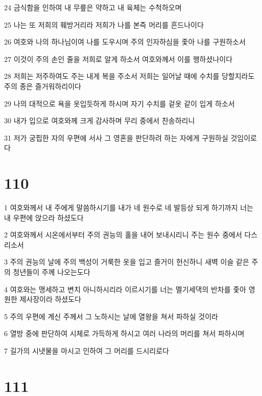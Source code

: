 \par 24 금식함을 인하여 내 무릎은 약하고 내 육체는 수척하오며
\par 25 나는 또 저희의 훼방거리라 저희가 나를 본즉 머리를 흔드나이다
\par 26 여호와 나의 하나님이여 나를 도우시며 주의 인자하심을 좇아 나를 구원하소서
\par 27 이것이 주의 손인 줄을 저희로 알게 하소서 여호와께서 이를 행하셨나이다
\par 28 저희는 저주하여도 주는 내게 복을 주소서 저희는 일어날 때에 수치를 당할지라도 주의 종은 즐거워하리이다
\par 29 나의 대적으로 욕을 옷입듯하게 하시며 자기 수치를 겉옷 같이 입게 하소서
\par 30 내가 입으로 여호와께 크게 감사하며 무리 중에서 찬송하리니
\par 31 저가 궁핍한 자의 우편에 서사 그 영혼을 판단하려 하는 자에게 구원하실 것임이로다

\chapter{110}

\par 1 여호와께서 내 주에게 말씀하시기를 내가 네 원수로 네 발등상 되게 하기까지 너는 내 우편에 앉으라 하셨도다
\par 2 여호와께서 시온에서부터 주의 권능의 홀을 내어 보내시리니 주는 원수 중에서 다스리소서
\par 3 주의 권능의 날에 주의 백성이 거룩한 옷을 입고 즐거이 헌신하니 새벽 이슬 같은 주의 청년들이 주께 나오는도다
\par 4 여호와는 맹세하고 변치 아니하시리라 이르시기를 너는 멜기세댁의 반차를 좇아 영원한 제사장이라 하셨도다
\par 5 주의 우편에 계신 주께서 그 노하시는 날에 열왕을 쳐서 파하실 것이라
\par 6 열방 중에 판단하여 시체로 가득하게 하시고 여러 나라의 머리를 쳐서 파하시며
\par 7 길가의 시냇물을 마시고 인하여 그 머리를 드시리로다

\chapter{111}

